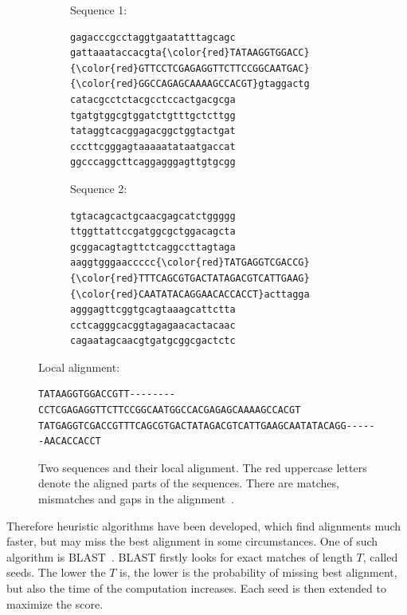 \begin{figure}[htp]
    \centering
    \begin{subfigure}[m]{0.45\textwidth}
    \centering
    \begin{center}
    Sequence 1:
    \end{center}
    \begin{BVerbatim}[commandchars=\\ \{ \}]
gagacccgcctaggtgaatatttagcagc
gattaaataccacgta{\color{red}TATAAGGTGGACC}
{\color{red}GTTCCTCGAGAGGTTCTTCCGGCAATGAC}
{\color{red}GGCCAGAGCAAAAGCCACGT}gtaggactg
catacgcctctacgcctccactgacgcga
tgatgtggcgtggatctgtttgctcttgg
tataggtcacggagacggctggtactgat
cccttcgggagtaaaaatataatgaccat
ggcccaggcttcaggagggagttgtgcgg

    \end{BVerbatim}
    \end{subfigure}
    \qquad
    \begin{subfigure}[m]{0.45\textwidth}
    \centering
    \begin{center}
    Sequence 2:
    \end{center}
    \begin{BVerbatim}[commandchars=\\ \{ \}]
tgtacagcactgcaacgagcatctggggg
ttggttattccgatggcgctggacagcta
gcggacagtagttctcaggccttagtaga
aaggtgggaaccccc{\color{red}TATGAGGTCGACCG}
{\color{red}TTTCAGCGTGACTATAGACGTCATTGAAG}
{\color{red}CAATATACAGGAACACCACCT}acttagga
agggagttcggtgcagtaaagcattctta
cctcagggcacggtagagaacactacaac
cagaatagcaacgtgatgcggcgactctc

    \end{BVerbatim}
    \end{subfigure}
    \begin{center}
    Local alignment:
    \end{center}
    \begin{BVerbatim}
TATAAGGTGGACCGTT--------CCTCGAGAGGTTCTTCCGGCAATGGCCACGAGAGCAAAAGCCACGT
TATGAGGTCGACCGTTTCAGCGTGACTATAGACGTCATTGAAGCAATATACAGG------AACACCACCT
    \end{BVerbatim}
    \caption[Local alignment]{Two sequences and their local alignment. The red uppercase letters denote the aligned parts of the sequences. There are matches, mismatches and gaps in the alignment~\cite{dipl}.}\label{fig:alignment_example}
\end{figure}

Therefore heuristic algorithms have been developed, which find alignments much faster, but may miss the best alignment in some circumstances. One of such algorithm is BLAST~\cite{blast}.
BLAST firstly looks for exact matches of length $T$, called seeds. The lower the $T$ is, the lower is the probability of missing best alignment, but also the time of the computation increases.
Each seed is then extended to maximize the score.

